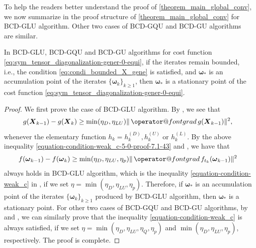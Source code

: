 \documentclass[final,onefignum,onetabnum]{siamart190516}
\makeatletter
\newcommand{\matr}[1]{\boldsymbol{#1}}
\newcommand{\ProjGrad}[2]{\mathop{{\operator@font grad} }#1(#2)}
\makeatother
\begin{document}
To help the readers better understand the proof of \cref{theorem_main_global_conv}, we now summarize in  the proof structure of \cref{theorem_main_global_conv} for BCD-GLU algorithm. Other two cases of BCD-GQU and BCD-GU algorithms are similar. 

\begin{figure}[omitted: a diagram of this paper's results, not reproduced here]\label{figure-flow-proof-3}\end{figure}

\begin{theorem}\label{theorem_main_weak_conv}
In BCD-GLU, BCD-GQU and BCD-GU algorithms for cost function \cref{eq:sym_tensor_diagonalization-gener-0-equi},
if the iterates remain bounded, i.e., the condition \cref{eq:condi_bounded_X_gene} is satisfied, 
and $\matr{\omega}_*$ is an accumulation point of the iterates $\{\matr{\omega}_{k}\}_{k\ge1}$,
then $\matr{\omega}_*$ is a stationary point of the cost function \cref{eq:sym_tensor_diagonalization-gener-0-equi}. 
\end{theorem}

\begin{proof}
We first prove the case of BCD-GLU algorithm. 
By , we see that  
\begin{equation}\label{equation-condition-weak_c-5-0-proof-7.1-43}
g(\matr{X}_{k-1})-g(\matr{X}_{k})\geq\min(\eta_{D},\eta_{LU})\|\ProjGrad{g}{\matr{X}_{k-1}}\|^2,
\end{equation}
whenever the elementary function $h_k=h^{(D)}_{k}, h^{(U)}_{k}$ or $h^{(L)}_k$. 
By the above inequality \cref{equation-condition-weak_c-5-0-proof-7.1-43} and , we have that 
\begin{equation}\label{eq:sufficient_descent-2-proof-6.11-32}
f(\matr{\omega}_{k-1})-f(\matr{\omega}_{k})\geq\min(\eta_{D},\eta_{LU},\eta_{p})\|\ProjGrad{f_{t_k}}{\matr{\omega}_{k-1}}\|^2
\end{equation}
always holds in BCD-GLU algorithm, which is the inequality \cref{equation-condition-weak_c} in , if we set $\eta=\min(\eta_{D},\eta_{LU},\eta_{p})$.
Therefore, if $\matr{\omega}_*$ is an accumulation point of the iterates $\{\matr{\omega}_k\}_{k\geq 1}$ produced by BCD-GLU algorithm,
then $\matr{\omega}_*$ is a stationary point. 
For other two cases of BCD-GQU and BCD-GU algorithms, by  and ,
we can similarly prove that the inequality \cref{equation-condition-weak_c} is always satisfied, if we set $\eta=\min(\eta_{D},\eta_{LU},\eta_{Q},\eta_{p})$ and $\min(\eta_{D},\eta_{LU},\eta_{p})$, respectively.  
The proof is complete. 
\end{proof}
\end{document}
